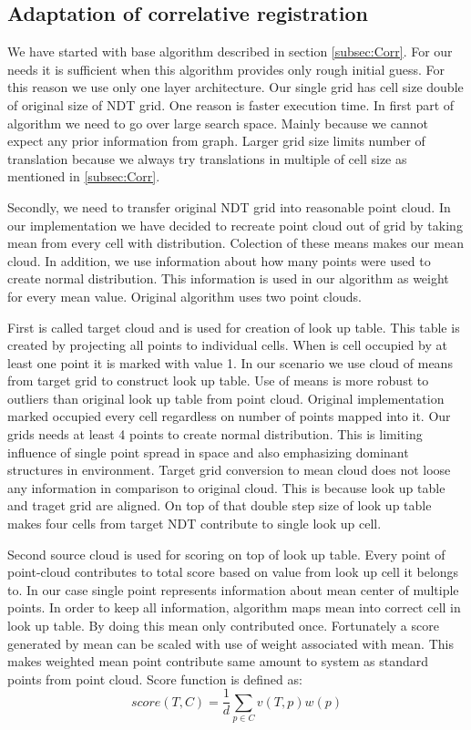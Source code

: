 \subsection{Adaptation of correlative registration}
We have started with base algorithm described in section \ref{subsec:Corr}. For our needs it is sufficient when this algorithm provides only rough initial guess. For this reason we use only one layer architecture. Our single grid has cell size double of original size of \gls{NDT} grid. One reason is faster execution time. In first part of algorithm we need to go over large search space. Mainly because we cannot expect any prior information from graph. Larger grid size limits number of translation because we always try translations in multiple of cell size as mentioned in \ref{subsec:Corr}. 

Secondly, we need to transfer original \gls{NDT} grid into reasonable point cloud. In our implementation we have decided to recreate point cloud out of grid by taking mean from every cell with distribution. Colection of these means makes our mean cloud. In addition, we use information about how many points were used to create normal distribution. This information is used in our algorithm as weight for every mean value. Original algorithm uses two point clouds. 

First is called target cloud and is used for creation of look up table. This table is created by projecting all points to individual cells. When is cell occupied by at least one point it is marked with value 1. In our scenario we use cloud of means from target grid to construct look up table. Use of means is more robust to outliers than original look up table from point cloud. Original implementation marked occupied every cell regardless on number of points mapped into it. Our grids needs at least 4 points to create normal distribution. This is limiting influence of single point spread in space and also emphasizing dominant structures in environment. Target grid conversion to mean cloud does not loose any information in comparison to original cloud. This is because look up table and traget grid are aligned. On top of that double step size of look up table makes four cells from target \gls{NDT} contribute to single look up cell.
  
Second source cloud is used for scoring on top of look up table. Every point of point-cloud contributes to total score based on value from look up cell it belongs to. In our case single point represents information about mean center of multiple points. In order to keep all information, algorithm maps mean into correct cell in look up table. By doing this mean only contributed once. Fortunately a score generated by mean can be scaled with use of weight associated with mean. This makes weighted mean point contribute same amount to system as standard points from point cloud. Score function is defined as:
\begin{equation}
score(T,C) = \frac{1}{d}\sum_{p \in C}^{} v(T,p) w(p) 
\end{equation}

